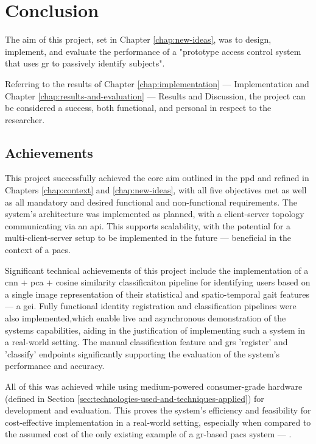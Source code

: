 \section{Conclusion}
\label{sec:conclusion}

The aim of this project, set in Chapter \ref{chap:new-ideas}, was to design, implement, and evaluate the performance of a "prototype access control system that uses \ac{gr} to passively identify subjects".

Referring to the results of Chapter \ref{chap:implementation} --- Implementation and Chapter \ref{chap:results-and-evaluation} --- Results and Discussion, the project can be considered a success, both functional, and personal in respect to the researcher.

\subsection{Achievements}

This project successfully achieved the core aim outlined in the \ac{ppd} and refined in Chapters \ref{chap:context} and \ref{chap:new-ideas}, with all five objectives met as well as all mandatory and desired functional and non-functional requirements.
The system's architecture was implemented as planned, with a client-server topology communicating via an \ac{api}.
This supports scalability, with the potential for a multi-client-server setup to be implemented in the future --- beneficial in the context of a \ac{pacs}.

Significant technical achievements of this project include the implementation of a \ac{cnn} + \ac{pca} + cosine similarity classificaiton pipeline for identifying users based on a single image representation of their statistical and spatio-temporal gait features --- a \ac{gei}.
Fully functional identity registration and classification pipelines were also implemented,which enable live and asynchronous demonstration of the systems capabilities, aiding in the justification of implementing such a system in a real-world setting. The manual classification feature and \ac{grs} 'register' and 'classify' endpoints  significantly supporting the evaluation of the system's performance and accuracy.

All of this was achieved while using medium-powered consumer-grade hardware (defined in Section \ref{sec:technologies-used-and-techniques-applied}) for development and evaluation. 
This proves the system's efficiency and feasibility for cost-effective implementation in a real-world setting, especially when compared to the assumed cost of the only existing example of a \ac{gr}-based \ac{pacs} system --- \cite{stepscanGaitAuthenticationSecurity2020}.

